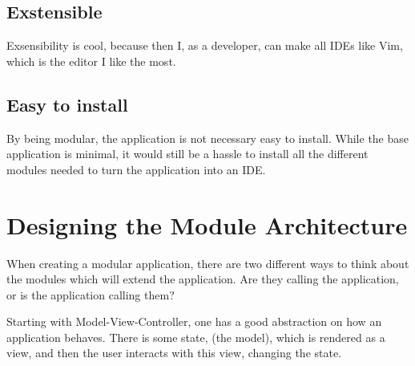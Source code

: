 \documentclass[runningheads]{llncs}
\begin{document}
\subsection{Exstensible}

Exsensibility is cool, because then I, as a developer, can make all IDEs like
Vim, which is the editor I like the most.

\subsection{Easy to install}
By being modular, the application is not necessary easy to install. While the
base application is minimal, it would still be a hassle to install all the
different modules needed to turn the application into an IDE.

\section{Designing the Module Architecture}

When creating a modular application, there are two different ways to think about
the modules which will extend the application. Are they calling the application,
or is the application calling them?


Starting with Model-View-Controller, one has a good abstraction on how an
application behaves. There is some state, (the model), which is rendered as a
view, and then the user interacts with this view, changing the state.

\end{document}
